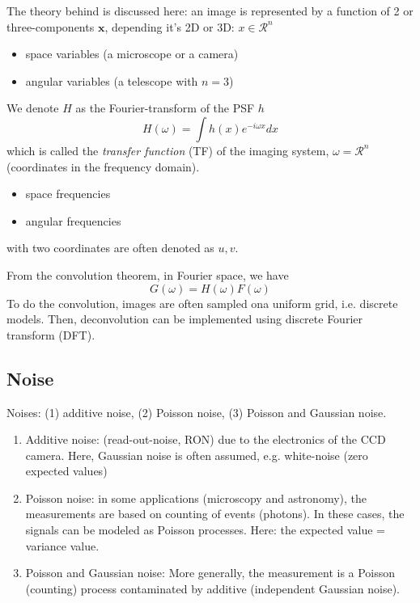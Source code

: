 The theory behind is discussed here: an image is represented by a function of 2
or three-components $\mathbf{x}$, depending it's 2D or 3D: $x\in \mathcal{R}^n$
\begin{itemize}
  \item space variables (a microscope or a camera)
  \item angular variables (a telescope with $n=3$)
\end{itemize}
We denote $H$ as the Fourier-transform of the PSF $h$
\begin{equation}
H(\omega) = \int h(x) e^{-i\omega x}dx
\end{equation}
which is called the {\it transfer function} (TF) of the imaging system,
$\omega=\mathcal{R}^n$ (coordinates in the frequency domain).
\begin{itemize}
  \item space frequencies
  \item angular frequencies
\end{itemize}
with two coordinates are often denoted as $u,v$.

From the convolution theorem, in Fourier space, we have
\begin{equation}
G(\omega) = H(\omega)F(\omega)
\end{equation}
To do the convolution, images are often sampled ona uniform grid, i.e. discrete
models. Then, deconvolution can be implemented using discrete Fourier transform
(DFT).

\subsection{Noise}

Noises: (1) additive noise, (2) Poisson noise, (3) Poisson and Gaussian noise.
\begin{enumerate}
  \item Additive noise: (read-out-noise, RON) due to the electronics of the CCD
  camera. Here, Gaussian noise is often assumed, e.g. white-noise (zero
  expected values)
  \item Poisson noise: in some applications (microscopy and astronomy), the
  measurements are based on counting of events (photons). In these cases, the
  signals can be modeled as Poisson processes. Here: the expected value =
  variance value.
  \item Poisson and Gaussian noise: More generally, the measurement is a Poisson
  (counting) process contaminated by additive (independent Gaussian noise). 
\end{enumerate}


